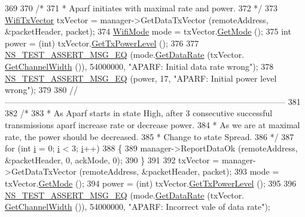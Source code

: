 \begin{DoxyCode}
369 
370   \textcolor{comment}{/*}
371 \textcolor{comment}{   * Aparf initiates with maximal rate and power.}
372 \textcolor{comment}{   */}
373   \hyperlink{classns3_1_1WifiTxVector}{WifiTxVector} txVector = manager->GetDataTxVector (remoteAddress, &packetHeader, packet);
374   \hyperlink{classns3_1_1WifiMode}{WifiMode} mode = txVector.\hyperlink{classns3_1_1WifiTxVector_a497b1f11cad4b8b26251dfa07c9ad1d6}{GetMode} ();
375   \textcolor{keywordtype}{int} power = (int) txVector.\hyperlink{classns3_1_1WifiTxVector_a7c98bd9609ff1c5cefa6e22d6908a2fe}{GetTxPowerLevel} ();
376 
377   \hyperlink{group__testing_ga2a9d78cffb3db8e867c35fff0b698cf5}{NS\_TEST\_ASSERT\_MSG\_EQ} (mode.\hyperlink{classns3_1_1WifiMode_adcfbe150f69da720db23387f733b8a52}{GetDataRate} (txVector.
      \hyperlink{classns3_1_1WifiTxVector_a1f8bfa51778a3e217581eb665f059564}{GetChannelWidth} ()), 54000000, \textcolor{stringliteral}{"APARF: Initial data rate wrong"});
378   \hyperlink{group__testing_ga2a9d78cffb3db8e867c35fff0b698cf5}{NS\_TEST\_ASSERT\_MSG\_EQ} (power, 17, \textcolor{stringliteral}{"APARF: Initial power level wrong"});
379 
380   \textcolor{comment}{//-----------------------------------------------------------------------------------------------------}
381 
382   \textcolor{comment}{/*}
383 \textcolor{comment}{   * As Aparf starts in state High, after 3 consecutive successful transmissions aparf increase rate or
       decrease power.}
384 \textcolor{comment}{   * As we are at maximal rate, the power should be decreased.}
385 \textcolor{comment}{   * Change to state Spread.}
386 \textcolor{comment}{   */}
387   \textcolor{keywordflow}{for} (\textcolor{keywordtype}{int} \hyperlink{bernuolliDistribution_8m_a6f6ccfcf58b31cb6412107d9d5281426}{i} = 0; \hyperlink{bernuolliDistribution_8m_a6f6ccfcf58b31cb6412107d9d5281426}{i} < 3; \hyperlink{bernuolliDistribution_8m_a6f6ccfcf58b31cb6412107d9d5281426}{i}++)
388     \{
389       manager->ReportDataOk (remoteAddress, &packetHeader, 0, ackMode, 0);
390     \}
391 
392   txVector = manager->GetDataTxVector (remoteAddress, &packetHeader, packet);
393   mode = txVector.\hyperlink{classns3_1_1WifiTxVector_a497b1f11cad4b8b26251dfa07c9ad1d6}{GetMode} ();
394   power = (int) txVector.\hyperlink{classns3_1_1WifiTxVector_a7c98bd9609ff1c5cefa6e22d6908a2fe}{GetTxPowerLevel} ();
395 
396   \hyperlink{group__testing_ga2a9d78cffb3db8e867c35fff0b698cf5}{NS\_TEST\_ASSERT\_MSG\_EQ} (mode.\hyperlink{classns3_1_1WifiMode_adcfbe150f69da720db23387f733b8a52}{GetDataRate} (txVector.
      \hyperlink{classns3_1_1WifiTxVector_a1f8bfa51778a3e217581eb665f059564}{GetChannelWidth} ()), 54000000, \textcolor{stringliteral}{"APARF: Incorrect vale of data rate"});

\end{DoxyCode}
